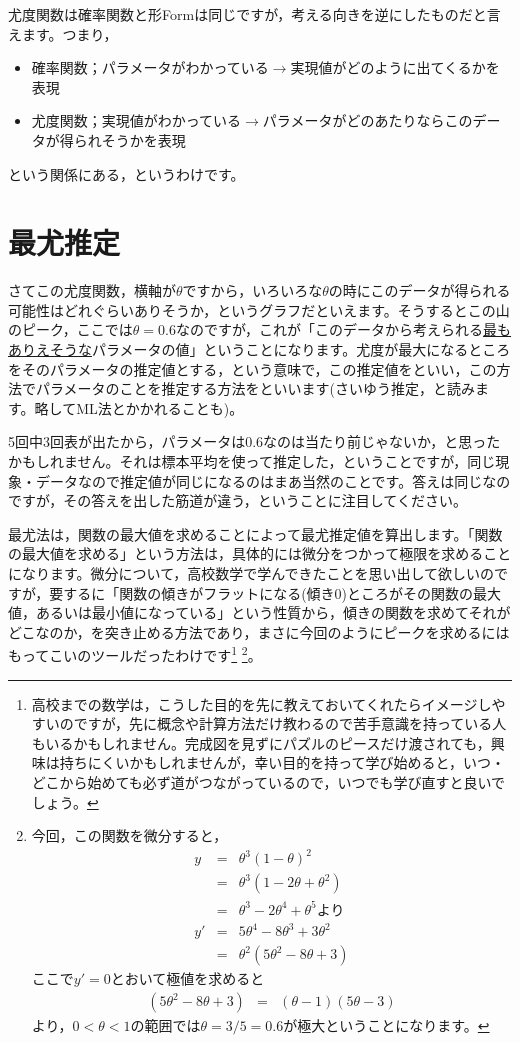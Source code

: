 \documentclass{ltjsbook}
\begin{document}
尤度関数は確率関数と形Formは同じですが，考える向きを逆にしたものだと言えます。つまり，
\begin{itemize}
	\item 確率関数；パラメータがわかっている$\to$実現値がどのように出てくるかを表現
	\item 尤度関数；実現値がわかっている$\to$パラメータがどのあたりならこのデータが得られそうかを表現
\end{itemize}
という関係にある，というわけです。

\section{最尤推定}
さてこの尤度関数，横軸が$\theta$ですから，いろいろな$\theta$の時にこのデータが得られる可能性はどれぐらいありそうか，というグラフだといえます。そうするとこの山のピーク，ここでは$\theta=0.6$なのですが，これが「このデータから考えられる\underline{最もありえそうな}パラメータの値」ということになります。尤度が最大になるところをそのパラメータの推定値とする，という意味で，この推定値をといい，この方法でパラメータのことを推定する方法をといいます(さいゆう推定，と読みます。略してML法とかかれることも)。

5回中3回表が出たから，パラメータは$0.6$なのは当たり前じゃないか，と思ったかもしれません。それは標本平均を使って推定した，ということですが，同じ現象・データなので推定値が同じになるのはまあ当然のことです。答えは同じなのですが，その答えを出した筋道が違う，ということに注目してください。

最尤法は，関数の最大値を求めることによって最尤推定値を算出します。「関数の最大値を求める」という方法は，具体的には微分をつかって極限を求めることになります。微分について，高校数学で学んできたことを思い出して欲しいのですが，要するに「関数の傾きがフラットになる(傾き$0$)ところがその関数の最大値，あるいは最小値になっている」という性質から，傾きの関数を求めてそれがどこなのか，を突き止める方法であり，まさに今回のようにピークを求めるにはもってこいのツールだったわけです\footnote{高校までの数学は，こうした目的を先に教えておいてくれたらイメージしやすいのですが，先に概念や計算方法だけ教わるので苦手意識を持っている人もいるかもしれません。完成図を見ずにパズルのピースだけ渡されても，興味は持ちにくいかもしれませんが，幸い目的を持って学び始めると，いつ・どこから始めても必ず道がつながっているので，いつでも学び直すと良いでしょう。}
\footnote{今回，この関数を微分すると，
	\begin{eqnarray*}
		y &=& \theta^3(1-\theta)^2 \\
		& =& \theta^3(1-2\theta+\theta^2)\\
		&=& \theta^3 - 2\theta^4 + \theta^5 \mbox{より}\\
		y' &=& 5\theta^4 - 8\theta^3 + 3\theta^2\\
		&=& \theta^2(5\theta^2-8\theta+3)
	\end{eqnarray*}
	ここで$y'=0$とおいて極値を求めると
	\begin{eqnarray*}
		(5\theta^2-8\theta+3) &=& (\theta -1)(5\theta -3)
	\end{eqnarray*}
	より，$0< \theta < 1$の範囲では$\theta=3/5=0.6$が極大ということになります。
}。
\end{document}
